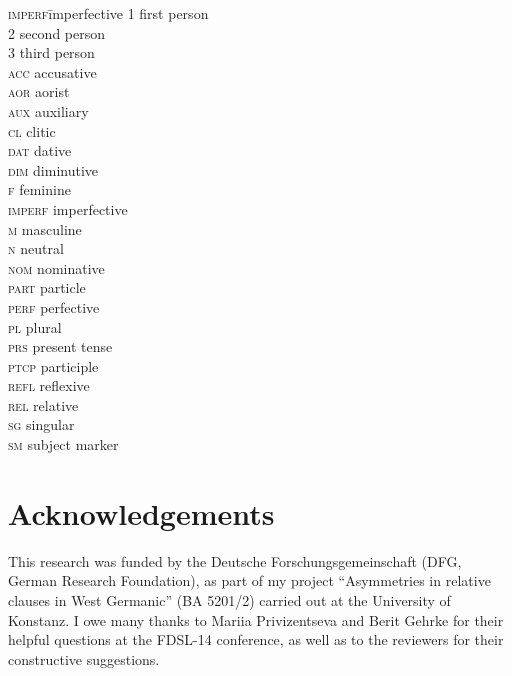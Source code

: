 \documentclass[output=paper]{langscibook}
\begin{document}
\begin{multicols}{2}
\begin{tabbing}
\textsc{imperf}\hspace{.5em}\=imperfective\kill
\textsc{1} \> first person\\
\textsc{2} \> second person\\
\textsc{3} \> third person\\
\textsc{acc} \> accusative\\
\textsc{aor} \> aorist\\
\textsc{aux} \> auxiliary\\
\textsc{cl} \> clitic\\
\textsc{dat} \> dative\\
\textsc{dim} \> diminutive\\
\textsc{f} \> feminine\\
\textsc{imperf} \> imperfective\\
\textsc{m} \> masculine\\
\textsc{n} \> neutral\\
\textsc{nom} \> nominative\\
\textsc{part} \> particle\\
\textsc{perf} \> perfective\\
\textsc{pl} \> plural\\
\textsc{prs} \> present tense\\
\textsc{ptcp} \> participle\\
\textsc{refl} \> reflexive\\
\textsc{rel} \> relative\\
\textsc{sg} \> singular\\
\textsc{sm} \> subject marker
\end{tabbing}
\end{multicols}

\section*{Acknowledgements}
This research was funded by the Deutsche Forschungsgemeinschaft (DFG, German Research Foundation), as part of my project ``Asymmetries in relative clauses in West Germanic'' (BA 5201/2) carried out at the University of Konstanz. I owe many thanks to Mariia Privizentseva and Berit Gehrke for their helpful questions at the FDSL-14 conference, as well as to the reviewers for their constructive suggestions.

\printbibliography[heading=subbibliography,notkeyword=this]
\end{document}
